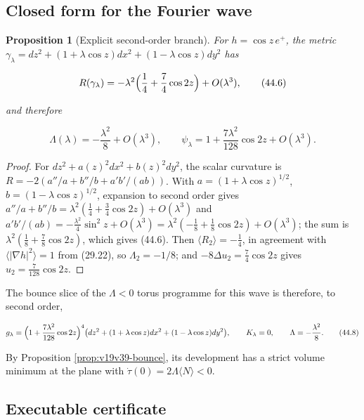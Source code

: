 \documentclass[11pt]{article}
\newtheorem{proposition}[theorem]{Proposition}
\theoremstyle{remark}
\begin{document}
\subsection{Closed form for the Fourier wave}

\begin{proposition}[Explicit second-order branch]
\label{prop:v19v41-fourier}
For \(h=\cos z\,e^+\), the metric
\(\gamma_\lambda=dz^2+(1+\lambda\cos z)dx^2+(1-\lambda\cos z)dy^2\) has

\[
 R(\gamma_\lambda)=-\lambda^2\Bigl(\frac14+\frac74\cos2z\Bigr)+O(\lambda^3),
                                                                    \tag{44.6}
\]

and therefore

\[
 \Lambda(\lambda)=-\frac{\lambda^2}8+O(\lambda^3),\qquad
 \psi_\lambda=1+\frac{7\lambda^2}{128}\cos2z+O(\lambda^3).            \tag{44.7}
\]
\end{proposition}

\begin{proof}
For \(dz^2+a(z)^2dx^2+b(z)^2dy^2\), the scalar curvature is
\(R=-2(a''/a+b''/b+a'b'/(ab))\).  With
\(a=(1+\lambda\cos z)^{1/2}\), \(b=(1-\lambda\cos z)^{1/2}\), expansion
to second order gives
\(a''/a+b''/b=\lambda^2(\tfrac14+\tfrac34\cos2z)+O(\lambda^3)\) and
\(a'b'/(ab)=-\tfrac{\lambda^2}4\sin^2z+O(\lambda^3)
=\lambda^2(-\tfrac18+\tfrac18\cos2z)+O(\lambda^3)\); the sum is
\(\lambda^2(\tfrac18+\tfrac78\cos2z)\), which gives (44.6).  Then
\(\langle R_2\rangle=-\tfrac14\), in agreement with
\(\langle|\nabla h|^2\rangle=1\) from (29.22), so \(\Lambda_2=-1/8\);
and \(-8\Delta u_2=\tfrac74\cos2z\) gives \(u_2=\tfrac7{128}\cos2z\).
\end{proof}

The bounce slice of the \(\Lambda<0\) torus programme for this wave is
therefore, to second order,

\[
 g_\lambda=\Bigl(1+\frac{7\lambda^2}{128}\cos2z\Bigr)^4
 \bigl(dz^2+(1+\lambda\cos z)dx^2+(1-\lambda\cos z)dy^2\bigr),
 \qquad K_\lambda=0,\qquad \Lambda=-\frac{\lambda^2}8.                 \tag{44.8}
\]

By Proposition \ref{prop:v19v39-bounce}, its development has a strict
volume minimum at the plane with \(\dot\tau(0)=2\Lambda\langle N\rangle<0\).

\subsection{Executable certificate}
\end{document}
